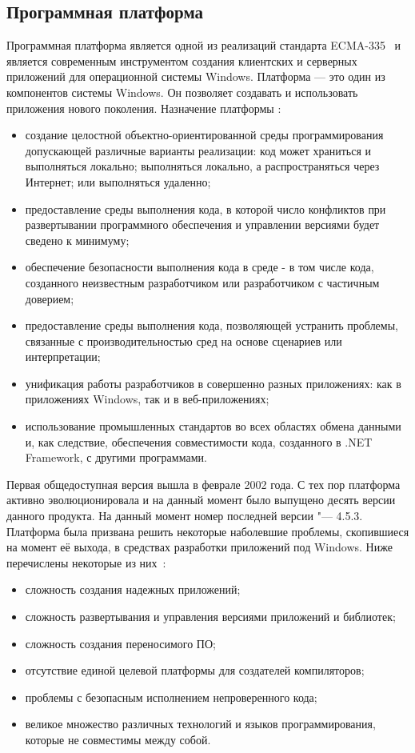 \subsection{Программная платформа \dotnet}
\label{sub:practice:microsoft_net}
Программная платформа \dotnet{} является одной из реализаций стандарта ECMA-335~\cite{ecma_335} и является современным инструментом создания клиентских и серверных приложений для операционной системы Windows.
Платформа \dotnet{} --- это один из компонентов системы Windows.
Он позволяет создавать и использовать приложения нового поколения.
Назначение платформы \dotnet{}:
\begin{itemize}
  \item	создание целостной объектно-ориентированной среды программирования допускающей различные варианты реализации: код может храниться и выполняться локально; выполняться локально, а распространяться через Интернет; или выполняться удаленно;
	\item предоставление среды выполнения кода, в которой число конфликтов при развертывании программного обеспечения и управлении версиями будет сведено к минимуму;
  \item обеспечение безопасности выполнения кода в среде - в том числе кода, созданного неизвестным разработчиком или разработчиком с частичным доверием;
  \item предоставление среды выполнения кода, позволяющей устранить проблемы, связанные с производительностью сред на основе сценариев или интерпретации;
  \item унификация работы разработчиков в совершенно разных приложениях: как в приложениях Windows, так и в веб-приложениях;
  \item использование промышленных стандартов во всех областях обмена данными и, как следствие, обеспечения совместимости кода, созданного в .NET Framework, с другими программами.
\end{itemize}

Первая общедоступная версия \netfx{} вышла в феврале 2002 года.
С тех пор платформа активно эволюционировала и на данный момент было выпущено десять версии данного продукта.
На данный момент номер последней версии \netfx{} "--- 4.5.3.
Платформа \dotnet{} была призвана решить некоторые наболевшие проблемы, скопившиеся на момент её выхода, в средствах разработки приложений под Windows.
Ниже перечислены некоторые из них~\cite[с.~\,--\,]{richter_2007_ru}:
\begin{itemize}
  \item сложность создания надежных приложений;
  \item сложность развертывания и управления версиями приложений и библиотек;
  \item сложность создания переносимого ПО;
  \item отсутствие единой целевой платформы для создателей компиляторов;
  \item проблемы с безопасным исполнением непроверенного кода;
  \item великое множество различных технологий и языков программирования, которые не совместимы между собой.
\end{itemize}

